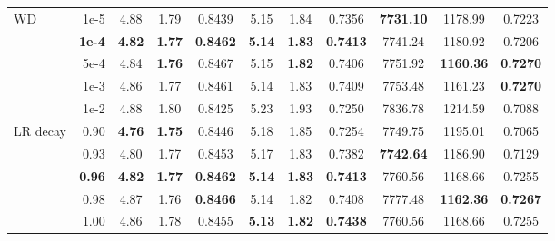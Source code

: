 \begin{longtable}{@{} l r  ccc  ccc  ccc @{}}
\multirow{5}{*}{WD}
  & 1e-5         & 4.88 & 1.79 & 0.8439 & 5.15 & 1.84 & 0.7356 & \textbf{7731.10} & 1178.99 & 0.7223 \\
  & \textbf{1e-4}& \textbf{4.82} & \textbf{1.77} & \textbf{0.8462} & \textbf{5.14} & \textbf{1.83} & \textbf{0.7413} & 7741.24 & 1180.92 & 0.7206 \\
  & 5e-4         & 4.84 & \textbf{1.76} & 0.8467 & 5.15 & \textbf{1.82} & 0.7406 & 7751.92 & \textbf{1160.36} & \textbf{0.7270} \\
  & 1e-3         & 4.86 & 1.77 & 0.8461 & 5.14 & 1.83 & 0.7409 & 7753.48 & 1161.23 & \textbf{0.7270} \\
  & 1e-2         & 4.88 & 1.80 & 0.8425 & 5.23 & 1.93 & 0.7250 & 7836.78 & 1214.59 & 0.7088 \\
\midrule[0.4pt]

\multirow{5}{*}{LR decay}
  & 0.90         & \textbf{4.76} & \textbf{1.75} & 0.8446 & 5.18 & 1.85 & 0.7254 & 7749.75 & 1195.01 & 0.7065 \\
  & 0.93         & 4.80 & 1.77 & 0.8453 & 5.17 & 1.83 & 0.7382 & \textbf{7742.64} & 1186.90 & 0.7129 \\
  & \textbf{0.96}& \textbf{4.82} & \textbf{1.77} & \textbf{0.8462} & \textbf{5.14} & \textbf{1.83} & \textbf{0.7413} & 7760.56 & 1168.66 & 0.7255 \\
  & 0.98         & 4.87 & 1.76 & \textbf{0.8466} & 5.14 & 1.82 & 0.7408 & 7777.48 & \textbf{1162.36} & \textbf{0.7267} \\
  & 1.00         & 4.86 & 1.78 & 0.8455 & \textbf{5.13} & \textbf{1.82} & \textbf{0.7438} & 7760.56 & 1168.66 & 0.7255 \\

\end{longtable}
\endgroup
\restoregeometry
